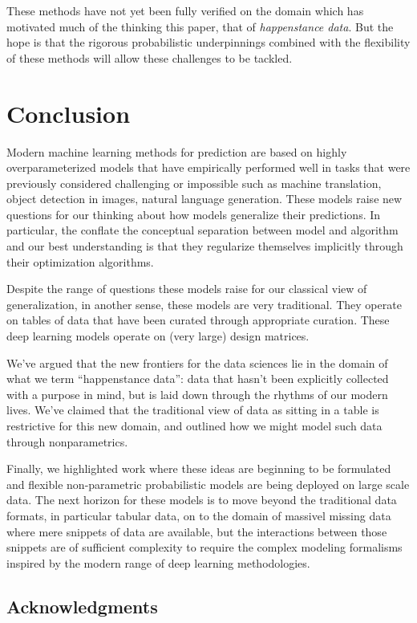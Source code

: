 \documentclass[a4paperpaper,]{article}
\begin{document}
These methods have not yet been fully verified on the domain which has motivated much of the thinking this paper, that of \emph{happenstance data}. But the hope is that the rigorous probabilistic underpinnings combined with the flexibility of these methods will allow these challenges to be tackled.

\hypertarget{conclusion}{%
\section{Conclusion}\label{conclusion}}


Modern machine learning methods for prediction are based on highly
overparameterized models that have empirically performed well in tasks
that were previously considered challenging or impossible such as
machine translation, object detection in images, natural language
generation. These models raise new questions for our thinking about how
models generalize their predictions. In particular, the conflate the
conceptual separation between model and algorithm and our best
understanding is that they regularize themselves implicitly through
their optimization algorithms.

Despite the range of questions these models raise for our classical view
of generalization, in another sense, these models are very traditional.
They operate on tables of data that have been curated through
appropriate curation. These deep learning models operate on (very large)
design matrices.

We've argued that the new frontiers for the data sciences lie in the
domain of what we term ``happenstance data'': data that hasn't been
explicitly collected with a purpose in mind, but is laid down through
the rhythms of our modern lives. We've claimed that the traditional
view of data as sitting in a table is restrictive for this new domain,
and outlined how we might model such data through nonparametrics.

Finally, we highlighted work where these ideas are beginning to be formulated and flexible non-parametric probabilistic models are being deployed on large scale data. The next horizon for these models is to move beyond the traditional data formats, in particular tabular data, on to the domain of massivel missing data where mere snippets of data are available, but the interactions between those snippets are of sufficient complexity to require the complex modeling formalisms inspired by the modern range of deep learning methodologies.

\hypertarget{acknowledgments}{%
\subsection{Acknowledgments}\label{acknowledgments}}
\end{document}
